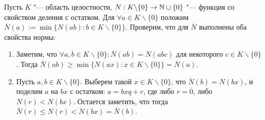 \Proof 
	Пусть $K$ "--- область целостности, $N: K \backslash \{0\} \to \mathbb{N} \cup \{0\}$ "--- функция со свойством деления с остатком. Для $\forall a \in K \backslash \{0\}$ положим $\overline{N}(a) := \min\{N(ab) : b \in K \backslash \{0\}\}$. Проверим, что для $\overline{N}$ выполнены оба свойства нормы:
	\begin{enumerate}
		\item Заметим, что $\forall a, b \in K \backslash \{0\}: \overline{N}(ab) = N(abc)$ для некоторого $c \in K \backslash \{0\}$. Тогда $\overline{N}(ab) \ge \min\{N(ax) : x \in K \backslash \{0\}\} = \overline{N}(a)$.
		\item Пусть $a, b \in K \backslash \{0\}$. Выберем такой $x \in K \backslash \{0\}$, что $\overline{N}(b) = N(bx)$, и поделим $a$ на $bx$ с остатком: $a = bxq + r$, где либо $r = 0$, либо $N(r) < N(bx)$. Остается заметить, что тогда $\overline{N}(r) \le N(r) < N(bx) = \overline{N}(b)$.\qedhere
	\end{enumerate}
\EndProof